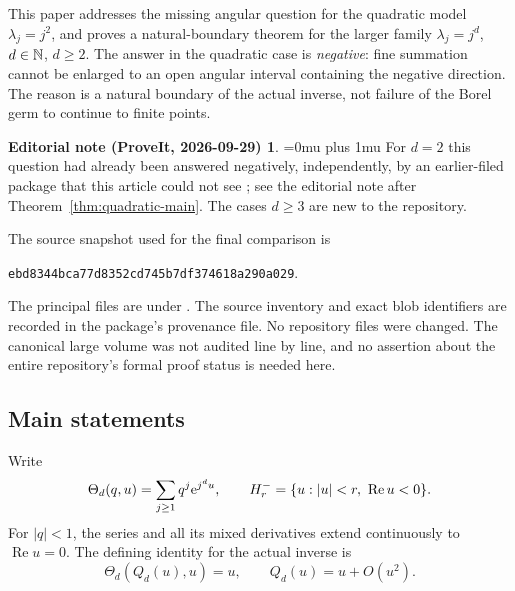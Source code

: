 \documentclass[11pt,a4paper]{article}
\numberwithin{equation}{section}
\theoremstyle{definition}\newtheorem{definition}[theorem]{Definition}
\theoremstyle{remark}\newtheorem{remark}[theorem]{Remark}
\theoremstyle{definition}
\newtheorem*{ednoteinner}{Editorial note (ProveIt, 2026-09-29)}
\newenvironment{ednote}{\begin{ednoteinner}\sloppy\Urlmuskip=0mu plus 1mu\relax}{\end{ednoteinner}}
\newcommand{\Rea}{\operatorname{Re}}\newcommand{\Ima}{\operatorname{Im}}
\begin{document}
This paper addresses the missing angular question for the quadratic model
$\lambda_j=j^2$, and proves a natural-boundary theorem for the larger family
$\lambda_j=j^d$, $d\in\mathbb N$, $d\ge2$. The answer in the quadratic case is
\emph{negative}: fine summation cannot be enlarged to an open angular interval
containing the negative direction. The reason is a natural boundary of the
actual inverse, not failure of the Borel germ to continue to finite points.
\begin{ednote}
For $d=2$ this question had already been answered negatively, independently,
by an earlier-filed package that this article could not see \cite{ed:nbq}; see
the editorial note after Theorem~\ref{thm:quadratic-main}. The cases
$d\ge3$ are new to the repository.
\end{ednote}

The source snapshot used for the final comparison is
\begin{center}\small\texttt{ebd8344bca77d8352cd745b7df374618a290a029}.\end{center}
The principal files are under
.
The source inventory and exact blob identifiers are recorded in the package's
provenance file. No repository files were changed. The canonical large volume
was not audited line by line, and no assertion about the entire repository's
formal proof status is needed here.

\subsection{Main statements}
Write
\begin{equation}
 \Theta_d(q,u)=\sum_{j\ge1}q^j\e^{j^d u},\qquad
 H_r^- =\{u:|u|<r,\ \Rea u<0\}.
 \label{eq:theta}
\end{equation}
For $|q|<1$, the series and all its mixed derivatives extend continuously to
$\Rea u=0$. The defining identity for the actual inverse is
\begin{equation}
 \Theta_d(Q_d(u),u)=u,\qquad Q_d(u)=u+O(u^2).
 \label{eq:inverse}
\end{equation}
\end{document}
